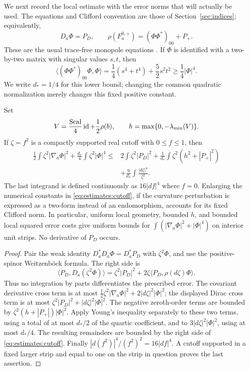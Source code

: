 We next record the local estimate with the error norms that will
actually be used.  The equations and Clifford convention are those of
Section~\ref{sec:indices}; equivalently,
\[
 D_a\Phi=P_D,\qquad
 \rho(F_a^{0,+})=(\Phi\Phi^*)_{00}+P_+.
\]
These are the usual trace-free monopole equations
\cite{FeehanLenessPU2I}.  If $\Phi$ is identified with a two-by-two
matrix with singular values $s,t$, then
\[
 \bigl\langle(\Phi\Phi^*)_{00}\Phi,\Phi\bigr\rangle
 =\frac14(s^4+t^4)+\frac52s^2t^2
 \geq\frac14|\Phi|^4.
\]
We write $d_*=1/4$ for this lower bound; changing the common quadratic
normalization merely changes this fixed positive constant.

\begin{lemma}
\label{lem:estimates:local}
Set
\[
 V=\frac{\operatorname{Scal}}{4}\operatorname{id}+\frac12\rho(b),\qquad
 h=\max\{0,-\lambda_{\min}(V)\}.
\]
If $\zeta=f^2$ is a compactly supported real cutoff with $0\leq f\leq1$,
then
\begin{equation}
 \begin{split}
 \frac12\int\zeta^2|\nabla_a\Phi|^2
   +\frac{d_*}{4}\int\zeta^2|\Phi|^4
 \leq{}&2\int\zeta^2|P_D|^2
       +\frac1{d_*}\int\zeta^2(h^2+|P_+|^2)\\
       &+\frac9{d_*}\int\frac{|d\zeta|^4}{\zeta^2}.
 \end{split}
 \label{eq:estimates:cutoff}
\end{equation}
The last integrand is defined continuously as $16|df|^4$ where
$f=0$.  Enlarging the numerical constants in
\eqref{eq:estimates:cutoff}, if the curvature perturbation is expressed
as a two-form instead of an endomorphism, accounts for its fixed
Clifford norm.
In particular, uniform local geometry, bounded $h$, and bounded
local squared error costs give uniform bounds for
$\int(|\nabla_a\Phi|^2+|\Phi|^4)$ on interior unit strips.  No derivative
of $P_D$ occurs.
\end{lemma}

\begin{proof}
Pair the weak identity $D_a^*D_a\Phi=D_a^*P_D$ with
$\zeta^2\Phi$, and use the positive-spinor Weitzenb\"ock formula.
The right side is
\[
 \langle P_D,D_a(\zeta^2\Phi)\rangle
 =\zeta^2|P_D|^2+
      2\zeta\langle P_D,\rho(d\zeta)\Phi\rangle.
\]
Thus no integration by parts differentiates the prescribed error.
The covariant derivative cross term is at most
$\frac12\zeta^2|\nabla_a\Phi|^2+2|d\zeta|^2|\Phi|^2$;
the displayed Dirac cross term is at most
$\zeta^2|P_D|^2+|d\zeta|^2|\Phi|^2$.
The negative zeroth-order terms are bounded by
$\zeta^2(h+|P_+|)|\Phi|^2$.  Apply Young's inequality separately to
these two terms, using a total of at most $d_*/2$ of the quartic
coefficient, and to $3|d\zeta|^2|\Phi|^2$, using at most $d_*/4$.
The resulting remainders are bounded by the right side of
\eqref{eq:estimates:cutoff}.  Finally
$|d(f^2)|^4/(f^2)^2=16|df|^4$.  A cutoff supported in a fixed larger
strip and equal to one on the strip in question proves the last
assertion.
\end{proof}

